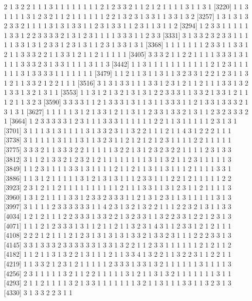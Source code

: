 \begin{Schunk}
\begin{Soutput}
[3183] 2 1 3 2 2 1 1 1 3 1 1 1 1 1 1 1 1 2 1 2 3 3 2 1 1 2 1 2 1 1 1 1 3 1 1 3 1
[3220] 1 1 3 1 1 1 1 3 1 2 3 2 1 1 2 1 1 1 1 1 1 2 2 1 3 2 3 1 3 3 1 1 3 3 1 3 2
[3257] 1 3 1 3 1 3 2 3 3 2 1 1 1 1 3 1 3 1 3 3 1 1 2 3 1 3 3 1 1 2 3 1 1 3 1 1 2
[3294] 1 2 3 3 1 1 1 1 1 1 3 3 1 2 2 3 3 3 3 2 1 3 1 2 3 1 1 1 1 3 3 3 1 1 2 3 3
[3331] 3 1 3 3 2 3 2 3 3 1 1 1 1 1 3 3 1 3 1 2 3 3 1 2 3 1 3 1 1 2 3 1 3 3 1 3 1
[3368] 1 1 1 1 1 1 1 2 3 3 1 1 3 3 1 2 1 1 3 3 3 2 2 1 1 3 3 1 2 1 1 2 1 1 1 1 1
[3405] 3 3 3 2 1 1 2 2 1 1 1 1 3 3 3 1 3 1 1 1 1 3 3 3 2 3 1 3 3 1 1 1 1 3 1 1 3
[3442] 1 1 3 1 1 1 1 1 1 1 1 1 1 1 2 1 2 3 1 1 1 1 1 1 3 1 3 3 3 3 1 1 1 1 1 1 1
[3479] 1 1 2 1 1 3 1 1 3 1 1 3 2 3 3 1 2 2 1 2 3 1 1 3 1 2 1 1 3 3 2 1 2 2 1 1 1
[3516] 3 1 3 1 3 3 1 1 1 3 3 1 2 3 1 2 1 1 2 1 1 1 3 3 1 3 2 1 3 3 1 3 2 1 3 1 1
[3553] 1 1 3 1 2 1 3 2 1 3 1 3 1 2 2 3 3 3 1 1 3 3 2 1 3 3 1 2 1 1 1 2 1 1 3 2 3
[3590] 3 3 3 3 1 1 2 1 3 3 3 1 3 1 1 3 1 1 3 3 3 1 1 2 1 3 3 1 3 3 3 2 1 3 1 3 1
[3627] 1 1 1 1 1 3 1 2 1 3 3 1 2 1 1 3 1 1 2 3 3 1 3 3 2 1 3 1 1 2 3 2 3 3 3 2 1
[3664] 1 2 3 3 3 3 3 1 2 3 1 1 1 3 3 3 1 1 1 1 1 1 2 2 1 1 3 1 1 1 1 1 2 3 1 3 1
[3701] 3 1 1 1 3 1 3 1 1 1 1 3 1 3 3 2 3 1 1 3 2 2 1 1 1 2 1 1 4 3 1 2 2 2 1 1 1
[3738] 3 1 1 1 1 1 3 1 1 1 3 1 1 3 2 3 1 1 2 1 2 1 2 1 2 3 1 1 1 1 2 2 1 1 1 1 1
[3775] 3 3 3 2 1 1 3 3 3 2 2 1 1 1 1 1 3 2 2 1 3 1 2 3 2 3 2 2 1 1 1 1 2 3 1 3 3
[3812] 3 1 1 2 1 3 3 2 1 2 3 2 1 2 1 1 1 1 1 1 1 1 3 1 1 3 2 1 1 2 3 1 1 1 1 1 3
[3849] 1 1 2 3 1 1 1 1 3 3 1 3 1 1 1 1 2 1 1 2 1 1 3 1 1 3 1 1 1 2 1 1 1 1 3 3 1
[3886] 1 1 3 1 2 1 1 1 1 1 3 1 2 1 3 1 3 1 1 1 2 3 3 1 1 1 2 2 1 2 1 1 1 1 1 2 2
[3923] 2 3 1 2 1 1 2 1 1 1 1 1 1 1 1 1 1 2 1 1 1 3 3 1 1 3 1 2 3 1 1 2 1 1 1 1 3
[3960] 1 3 1 2 1 1 1 1 3 3 1 2 3 3 2 3 3 3 1 1 2 1 3 1 2 3 1 1 3 1 1 1 1 1 3 1 3
[3997] 3 1 1 1 1 2 3 3 3 3 3 3 1 1 4 2 3 1 3 2 1 3 2 2 1 1 1 2 2 3 2 1 3 1 1 3 3
[4034] 1 2 1 2 1 1 1 2 2 3 3 3 1 3 3 2 2 1 3 2 3 3 1 1 3 2 2 3 3 1 2 2 1 2 3 1 3
[4071] 1 1 1 2 1 2 3 3 3 1 3 1 1 2 1 1 2 1 1 3 2 3 1 4 3 1 1 2 3 3 1 2 1 2 1 1 1
[4108] 2 2 2 1 2 1 1 1 2 1 2 3 1 3 1 3 1 3 1 3 3 2 1 3 3 2 3 1 1 1 2 2 2 3 3 1 3
[4145] 3 3 1 3 3 3 2 3 3 3 3 3 3 1 3 3 1 3 2 2 1 1 2 3 3 1 1 1 1 1 1 2 1 2 1 1 2
[4182] 1 1 2 1 1 3 1 3 2 2 1 3 1 1 1 2 1 1 3 3 4 1 3 2 2 1 1 3 2 2 3 1 1 2 2 1 1
[4219] 1 1 3 3 2 1 2 3 1 2 1 1 1 1 1 2 3 3 3 1 3 3 1 3 2 1 1 1 1 1 1 3 1 1 1 1 3
[4256] 2 3 1 1 1 1 1 3 2 1 1 2 2 1 1 1 1 1 3 1 2 1 1 3 1 3 2 1 1 1 1 1 1 1 3 1 1
[4293] 2 1 1 2 1 1 1 1 3 2 1 3 3 1 1 1 1 1 1 1 3 2 1 1 3 1 1 1 3 3 1 1 3 2 3 1 3
[4330] 3 1 3 3 2 2 3 1 1
\end{Soutput}
\end{Schunk}

